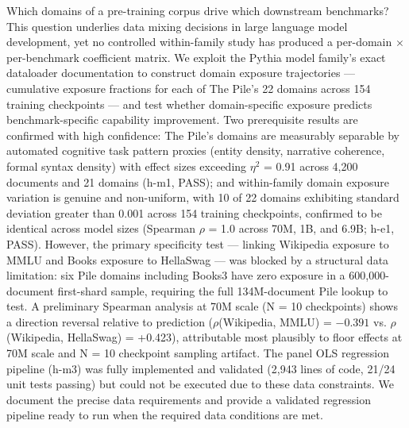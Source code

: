
Which domains of a pre-training corpus drive which downstream benchmarks? This question underlies data mixing decisions in large language model development, yet no controlled within-family study has produced a per-domain $\times$ per-benchmark coefficient matrix. We exploit the Pythia model family's exact dataloader documentation to construct domain exposure trajectories --- cumulative exposure fractions for each of The Pile's 22 domains across 154 training checkpoints --- and test whether domain-specific exposure predicts benchmark-specific capability improvement. Two prerequisite results are confirmed with high confidence: The Pile's domains are measurably separable by automated cognitive task pattern proxies (entity density, narrative coherence, formal syntax density) with effect sizes exceeding $\eta^2$ = 0.91 across 4,200 documents and 21 domains (h-m1, PASS); and within-family domain exposure variation is genuine and non-uniform, with 10 of 22 domains exhibiting standard deviation greater than 0.001 across 154 training checkpoints, confirmed to be identical across model sizes (Spearman $\rho$ = 1.0 across 70M, 1B, and 6.9B; h-e1, PASS). However, the primary specificity test --- linking Wikipedia exposure to MMLU and Books exposure to HellaSwag --- was blocked by a structural data limitation: six Pile domains including Books3 have zero exposure in a 600,000-document first-shard sample, requiring the full 134M-document Pile lookup to test. A preliminary Spearman analysis at 70M scale (N = 10 checkpoints) shows a direction reversal relative to prediction ($\rho$(Wikipedia, MMLU) = $-0.391$ vs. $\rho$(Wikipedia, HellaSwag) = +0.423), attributable most plausibly to floor effects at 70M scale and N = 10 checkpoint sampling artifact. The panel OLS regression pipeline (h-m3) was fully implemented and validated (2,943 lines of code, 21/24 unit tests passing) but could not be executed due to these data constraints. We document the precise data requirements and provide a validated regression pipeline ready to run when the required data conditions are met.

